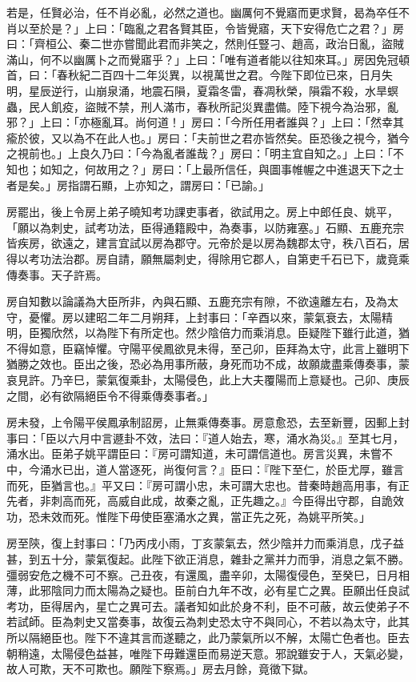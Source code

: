 \begin{pinyinscope}
若是，任賢必治，任不肖必亂，必然之道也。幽厲何不覺寤而更求賢，曷為卒任不肖以至於是？」上曰：「臨亂之君各賢其臣，令皆覺寤，天下安得危亡之君？」房曰：「齊桓公、秦二世亦嘗聞此君而非笑之，然則任豎刁、趙高，政治日亂，盜賊滿山，何不以幽厲卜之而覺寤乎？」上曰：「唯有道者能以往知來耳。」房因免冠頓首，曰：「春秋紀二百四十二年災異，以視萬世之君。今陛下即位已來，日月失明，星辰逆行，山崩泉涌，地震石隕，夏霜冬雷，春凋秋榮，隕霜不殺，水旱螟蟲，民人飢疫，盜賊不禁，刑人滿市，春秋所記災異盡備。陸下視今為治邪，亂邪？」上曰：「亦極亂耳。尚何道！」房曰：「今所任用者誰與？」上曰：「然幸其瘉於彼，又以為不在此人也。」房曰：「夫前世之君亦皆然矣。臣恐後之視今，猶今之視前也。」上良久乃曰：「今為亂者誰哉？」房曰：「明主宜自知之。」上曰：「不知也；如知之，何故用之？」房曰：「上最所信任，與圖事帷幄之中進退天下之士者是矣。」房指謂石顯，上亦知之，謂房曰：「已諭。」

房罷出，後上令房上弟子曉知考功課吏事者，欲試用之。房上中郎任良、姚平，「願以為刺史，試考功法，臣得通籍殿中，為奏事，以防雍塞。」石顯、五鹿充宗皆疾房，欲遠之，建言宜試以房為郡守。元帝於是以房為魏郡太守，秩八百石，居得以考功法治郡。房自請，願無屬刺史，得除用它郡人，自第吏千石已下，歲竟乘傳奏事。天子許焉。

房自知數以論議為大臣所非，內與石顯、五鹿充宗有隙，不欲遠離左右，及為太守，憂懼。房以建昭二年二月朔拜，上封事曰：「辛酉以來，蒙氣衰去，太陽精明，臣獨欣然，以為陛下有所定也。然少陰倍力而乘消息。臣疑陛下雖行此道，猶不得如意，臣竊悼懼。守陽平侯鳳欲見未得，至己卯，臣拜為太守，此言上雖明下猶勝之效也。臣出之後，恐必為用事所蔽，身死而功不成，故願歲盡乘傳奏事，蒙哀見許。乃辛巳，蒙氣復乘卦，太陽侵色，此上大夫覆陽而上意疑也。己卯、庚辰之間，必有欲隔絕臣令不得乘傳奏事者。」

房未發，上令陽平侯鳳承制詔房，止無乘傳奏事。房意愈恐，去至新豐，因郵上封事曰：「臣以六月中言遯卦不效，法曰：『道人始去，寒，涌水為災。』至其七月，涌水出。臣弟子姚平謂臣曰：『房可謂知道，未可謂信道也。房言災異，未嘗不中，今涌水已出，道人當逐死，尚復何言？』臣曰：『陛下至仁，於臣尤厚，雖言而死，臣猶言也。』平又曰：『房可謂小忠，未可謂大忠也。昔秦時趙高用事，有正先者，非刺高而死，高威自此成，故秦之亂，正先趣之。』今臣得出守郡，自詭效功，恐未效而死。惟陛下毋使臣塞涌水之異，當正先之死，為姚平所笑。」

房至陝，復上封事曰：「乃丙戌小雨，丁亥蒙氣去，然少陰并力而乘消息，戊子益甚，到五十分，蒙氣復起。此陛下欲正消息，雜卦之黨并力而爭，消息之氣不勝。彊弱安危之機不可不察。己丑夜，有還風，盡辛卯，太陽復侵色，至癸巳，日月相薄，此邪陰同力而太陽為之疑也。臣前白九年不改，必有星亡之異。臣願出任良試考功，臣得居內，星亡之異可去。議者知如此於身不利，臣不可蔽，故云使弟子不若試師。臣為刺史又當奏事，故復云為刺史恐太守不與同心，不若以為太守，此其所以隔絕臣也。陛下不違其言而遂聽之，此乃蒙氣所以不解，太陽亡色者也。臣去朝稍遠，太陽侵色益甚，唯陛下毋難還臣而易逆天意。邪說雖安于人，天氣必變，故人可欺，天不可欺也。願陛下察焉。」房去月餘，竟徵下獄。


\end{pinyinscope}
